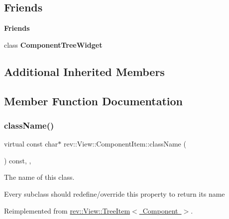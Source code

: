 \subsection*{Friends}
\begin{Indent}\textbf{ Friends}\par
\begin{DoxyCompactItemize}
\item 
\mbox{\label{classrev_1_1_view_1_1_component_item_a350b4d2b555fb1075041d366ade3f718}} 
class {\bfseries Component\+Tree\+Widget}
\end{DoxyCompactItemize}
\end{Indent}
\subsection*{Additional Inherited Members}


\subsection{Member Function Documentation}
\mbox{\label{classrev_1_1_view_1_1_component_item_ab841f5681c0a147d32680d0f3a1f62e7}} 
\subsubsection{\texorpdfstring{className()}{className()}}
{\footnotesize\ttfamily virtual const char$\ast$ rev\+::\+View\+::\+Component\+Item\+::class\+Name (\begin{DoxyParamCaption}{ }\end{DoxyParamCaption}) const\hspace{0.3cm}{\ttfamily [inline]}, {\ttfamily [override]}, {\ttfamily [virtual]}}



The name of this class. 

Every subclass should redefine/override this property to return its name 

Reimplemented from \mbox{\hyperlink{classrev_1_1_view_1_1_tree_item_a8a12a6ceece6cab7a2299da2b5e6a54b}{rev\+::\+View\+::\+Tree\+Item$<$ Component $>$}}.

\mbox{\label{classrev_1_1_view_1_1_component_item_a75651a2035c376c2fa679eb614b430a3}} 
